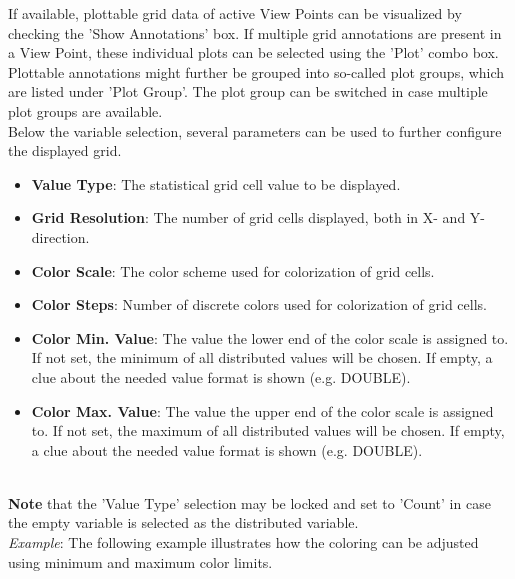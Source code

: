 If available, plottable grid data of active View Points can be visualized by checking the 'Show Annotations' box.
If multiple grid annotations are present in a View Point, these individual plots can be selected using the 'Plot' combo box.
Plottable annotations might further be grouped into so-called plot groups, which are listed under 'Plot Group'.
The plot group can be switched in case multiple plot groups are available. \\

Below the variable selection, several parameters can be used to further configure the displayed grid.

\begin{itemize}
    \item \textbf{Value Type}: The statistical grid cell value to be displayed.
    \item \textbf{Grid Resolution}: The number of grid cells displayed, both in X- and Y-direction. 
    \item \textbf{Color Scale}: The color scheme used for colorization of grid cells.
    \item \textbf{Color Steps}: Number of discrete colors used for colorization of grid cells.
    \item \textbf{Color Min. Value}: The value the lower end of the color scale is assigned to. 
        If not set, the minimum of all distributed values will be chosen.
        If empty, a clue about the needed value format is shown (e.g. DOUBLE). 
    \item \textbf{Color Max. Value}: The value the upper end of the color scale is assigned to. 
        If not set, the maximum of all distributed values will be chosen.
        If empty, a clue about the needed value format is shown (e.g. DOUBLE). 
   \end{itemize}
   \ \\

\textbf{Note} that the 'Value Type' selection may be locked and set to 'Count' in case the empty variable is selected 
as the distributed variable. \\

\textit{Example}: The following example illustrates how the coloring can be adjusted using minimum and maximum color limits. \\

